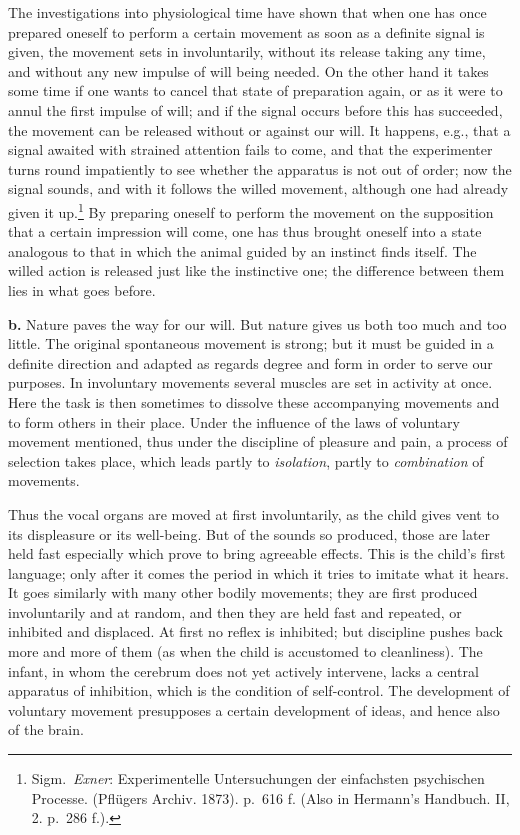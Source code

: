 \documentclass[12pt,a4paper]{book}
\newcommand{\opage}[1]{\marginnote{\footnotesize\textit{[#1]}}}
\begin{document}
The investigations into physiological time have shown that when one has
once prepared oneself to perform a certain movement as soon as a definite
signal is given, the movement sets in involuntarily, without its release
taking any time, and without any new impulse of will being needed. On the
other hand it takes some time if one wants to cancel that state of
preparation again, or as it were to annul the first impulse of will; and
if the signal occurs before this has succeeded, the movement can be
released without or against our will. It happens, e.g., that a signal
awaited with strained attention fails to come, and that the experimenter
turns round impatiently to see whether
\opage{377}the apparatus is not out of order; now the signal sounds, and
with it follows the willed movement, although one had already given
it up.\footnote{Sigm.\ \emph{Exner}: Experimentelle Untersuchungen der
einfachsten psychischen Processe. (Pflügers Archiv. 1873). p.~616 f.
(Also in Hermann’s Handbuch. II, 2. p.~286 f.).} By preparing oneself to
perform the movement on the supposition that a certain impression will
come, one has thus brought oneself into a state analogous to that in
which the animal guided by an instinct finds itself. The willed action is
released just like the instinctive one; the difference between them lies
in what goes before.

\textbf{b.} Nature paves the way for our will. But nature gives us both
too much and too little. The original spontaneous movement is strong; but
it must be guided in a definite direction and adapted as regards degree
and form in order to serve our purposes. In involuntary movements several
muscles are set in activity at once. Here the task is then sometimes to
dissolve these accompanying movements and to form others in their place.
Under the influence of the laws of voluntary movement mentioned, thus
under the discipline of pleasure and pain, a process of selection takes
place, which leads partly to \emph{isolation}, partly to
\emph{combination} of movements.

Thus the vocal organs are moved at first involuntarily, as the child
gives vent to its displeasure or its well-being. But of the sounds so
produced, those are later held fast especially which prove to bring
agreeable effects. This is the child's first language; only after it
comes the period in which it tries to imitate what it hears. It goes
similarly with many other bodily movements; they are first produced
involuntarily and at random, and then they are held fast and repeated, or
inhibited and displaced. At first no reflex is inhibited; but discipline
pushes back more and more of them (as when the child is accustomed to
cleanliness). The infant, in whom the cerebrum does not yet actively
intervene, lacks a central apparatus of inhibition, which is the
condition of self-control. The development of voluntary movement
presupposes a certain development of ideas, and hence also of the brain.
\end{document}

